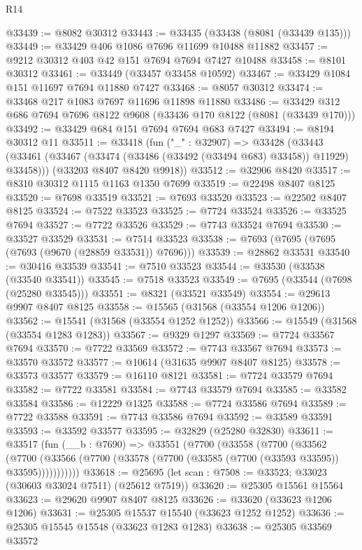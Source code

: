 \begin{lexlean}{R14}
\begin{coremodule}
@33439 := @8082 @30312
@33443 := @33435 (@33438 (@8081 (@33439 @135)))
@33449 := @33429 @406 @1086 @7696 @11699 @10488 @11882
@33457 := @9212 @30312 @403 @42 @151 @7694 @7694 @7427 @10488
@33458 := @8101 @30312
@33461 := @33449 (@33457 @33458 @10592)
@33467 := @33429 @1084 @151 @11697 @7694 @11880 @7427
@33468 := @8057 @30312
@33474 := @33468 @217 @1083 @7697 @11696 @11898 @11880
@33486 := @33429 @312 @686 @7694 @7696 @8122 @9608 (@33436 @170 @8122 (@8081 (@33439 @170)))
@33492 := @33429 @684 @151 @7694 @7694 @683 @7427
@33494 := @8194 @30312 @11
@33511 := @33418
    (fun ("_" : @32907) =>
    @33428
      (@33443 (@33461 (@33467 (@33474 (@33486 (@33492 (@33494 @683) @33458)) @11929) @33458)))
      (@33203 @8407 @8420 @9918))
@33512 := @32906 @8420
@33517 := @8310 @30312 @1115 @1163 @1350 @7699
@33519 := @22498 @8407 @8125
@33520 := @7698 @33519
@33521 := @7693 @33520
@33523 := @22502 @8407 @8125
@33524 := @7522 @33523
@33525 := @7724 @33524
@33526 := @33525 @7694
@33527 := @7722 @33526
@33529 := @7743 @33524 @7694
@33530 := @33527 @33529
@33531 := @7514 @33523
@33538 := @7693 (@7695 (@7695 (@7693 (@9670 (@28859 @33531)) @7696)))
@33539 := @28862 @33531
@33540 := @30416 @33539
@33541 := @7510 @33523
@33544 := @33530 (@33538 (@33540 @33541))
@33545 := @7518 @33523
@33549 := @7695 (@33544 (@7698 (@25280 @33545)))
@33551 := @8321 (@33521 @33549)
@33554 := @29613 @9907 @8407 @8125
@33558 := @15565 (@31568 (@33554 @1206 @1206))
@33562 := @15541 (@31568 (@33554 @1252 @1252))
@33566 := @15549 (@31568 (@33554 @1283 @1283))
@33567 := @9329 @1297
@33569 := @7724 @33567 @7694
@33570 := @7722 @33569
@33572 := @7743 @33567 @7694
@33573 := @33570 @33572
@33577 := @10614 (@31635 @9907 @8407 @8125)
@33578 := @33573 @33577
@33579 := @16110 @8121
@33581 := @7724 @33579 @7694
@33582 := @7722 @33581
@33584 := @7743 @33579 @7694
@33585 := @33582 @33584
@33586 := @12229 @1325
@33588 := @7724 @33586 @7694
@33589 := @7722 @33588
@33591 := @7743 @33586 @7694
@33592 := @33589 @33591
@33593 := @33592 @33577
@33595 := @32829 (@25280 @32830)
@33611 := @33517
    (fun (__b : @7690) =>
    @33551
      (@7700
        (@33558
          (@7700
            (@33562
              (@7700 (@33566 (@7700 (@33578 (@7700 (@33585 (@7700 (@33593 @33595)) @33595)))))))))))
@33618 := @25695 (let scan : @7508 := @33523; @33023 (@30603 @33024 @7511) (@25612 @7519))
@33620 := @25305 @15561 @15564
@33623 := @29620 @9907 @8407 @8125
@33626 := @33620 (@33623 @1206 @1206)
@33631 := @25305 @15537 @15540 (@33623 @1252 @1252)
@33636 := @25305 @15545 @15548 (@33623 @1283 @1283)
@33638 := @25305 @33569 @33572

\end{coremodule}
\end{lexlean}
